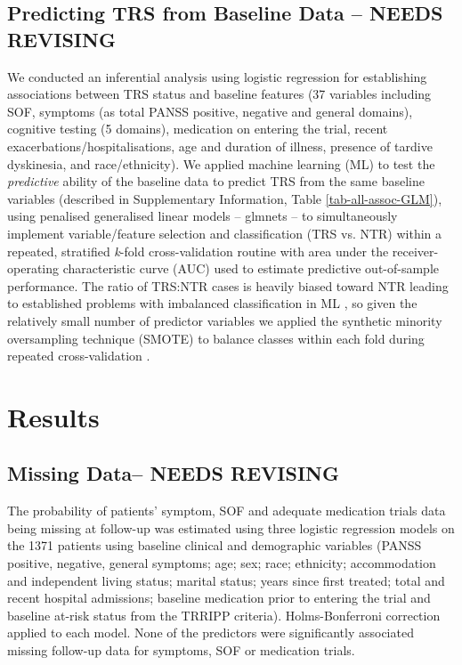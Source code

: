 \documentclass[a4paper,nobib]{article}
\begin{document}
\subsection*{Predicting TRS from Baseline Data -- NEEDS REVISING }
We conducted an inferential analysis using logistic regression for establishing associations between TRS status and baseline features (37 variables including SOF, symptoms (as total PANSS positive, negative and general domains), cognitive testing (5 domains), medication on entering the trial, recent exacerbations/hospitalisations, age and duration of illness, presence of tardive dyskinesia, and race/ethnicity).  We applied machine learning (ML) to test the \emph{predictive} ability of the baseline data to predict TRS from the same baseline variables (described in Supplementary Information, Table \ref{tab-all-assoc-GLM}), using penalised generalised linear models -- glmnets \citep{Friedman2010} -- to simultaneously implement variable/feature selection and classification (TRS vs. NTR) within a repeated, stratified \emph{k}-fold cross-validation routine with area under the receiver-operating characteristic curve (AUC) used to estimate predictive out-of-sample performance.  The ratio of TRS:NTR cases is heavily biased toward NTR leading to established problems with imbalanced classification in ML \citep{He2009}, so given the relatively small number of predictor variables \citep{Blagus2013} we applied the synthetic minority oversampling technique (SMOTE) to balance classes within each fold during repeated cross-validation \citep{Chawla2002}.

\section{Results}
\subsection{Missing Data-- NEEDS REVISING}
The probability of patients' symptom, SOF and adequate medication trials data being missing at follow-up was estimated using three logistic regression models on the 1371 patients using baseline clinical and demographic variables (PANSS positive, negative, general symptoms; age; sex; race; ethnicity; accommodation and independent living status; marital status; years since first treated; total and recent hospital admissions; baseline medication prior to entering the trial and baseline at-risk status from the TRRIPP criteria).  Holms-Bonferroni correction applied to each model.  None of the predictors were significantly associated missing follow-up data for symptoms, SOF or medication trials. 
\end{document}

